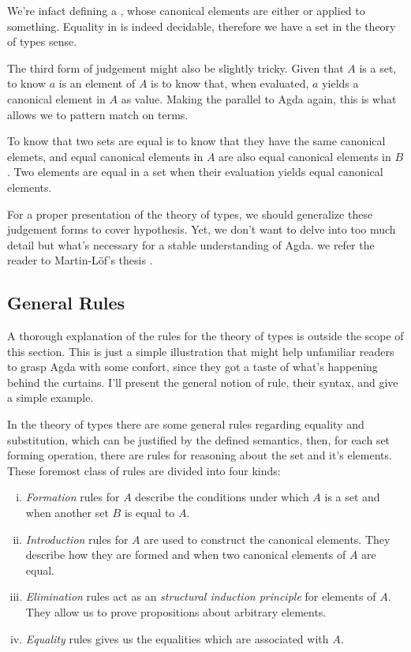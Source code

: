 
We're infact defining a , whose canonical elements are either  or
 applied to something. Equality in  is indeed decidable, therefore we have a set
in the theory of types sense.

The third form of judgement might also be slightly tricky. Given that $A$ is a set, 
to know $a$ is an element of $A$ is to know that, when evaluated, $a$ yields a canonical element in $A$
as value. Making the parallel to Agda again, this is what allows we to pattern match on terms.

To know that two sets are equal is to know that they have the same canonical elemets, and
equal canonical elements in $A$ are also equal canonical elements in $B$. Two elements are
equal in a set when their evaluation yields equal canonical elements.

For a proper presentation of the theory of types, we should generalize these judgement forms
to cover hypothesis. Yet, we don't want to delve into too much detail but what's necessary for 
a stable understanding of Agda. we refer the reader to Martin-L\"{o}f's thesis \cite{lof84,lof85}.

\subsection{General Rules}

A thorough explanation of the rules for the theory of types is outside the scope of this section. 
This is just a simple illustration that might help unfamiliar readers to grasp Agda with
some confort, since they got a taste of what's happening behind the curtains. I'll present the
general notion of rule, their syntax, and give a simple example.

In the theory of types there are some general rules regarding equality and substitution, 
which can be justified by the defined semantics, then, for each set forming operation, there
are rules for reasoning about the set and it's elements. These foremost class of rules
are divided into four kinds:

\begin{enumerate}[i)]
  \item \emph{Formation} rules for $A$ describe the conditions under which $A$ is a set and
        when another set $B$ is equal to $A$.
        
  \item \emph{Introduction} rules for $A$ are used to construct the canonical elements. They
        describe how they are formed and when two canonical elements of $A$ are equal.
        
  \item \emph{Elimination} rules act as an \emph{structural induction principle} for elements of $A$.
        They allow us to prove propositions about arbitrary elements.
        
  \item \emph{Equality} rules gives us the equalities which are associated with $A$.
\end{enumerate}

